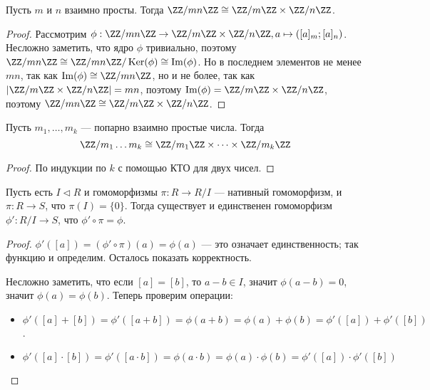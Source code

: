 \documentclass[12pt,a4paper]{article}
\DeclareMathOperator{\Img}{Im}
\DeclareMathOperator{\Ker}{Ker}
\begin{document}
    \begin{theorem}
        Пусть $m$ и $n$ взаимно просты. Тогда $\ZZ/mn\ZZ \cong \ZZ/m\ZZ \times \ZZ/n\ZZ$.
    \end{theorem}

    \begin{proof}
        Рассмотрим $\phi: \ZZ/mn\ZZ \to \ZZ/m\ZZ \times \ZZ/n\ZZ, a \mapsto ([a]_m; [a]_n)$. Несложно заметить, что ядро $\phi$ тривиально, поэтому $\ZZ/mn\ZZ \cong \ZZ/mn\ZZ/\Ker(\phi) \cong \Img(\phi)$. Но в последнем элементов не менее $mn$, так как $\Img(\phi) \cong \ZZ/mn\ZZ$, но и не более, так как $|\ZZ/m\ZZ \times \ZZ/n\ZZ| = mn$, поэтому $\Img(\phi) = \ZZ/m\ZZ \times \ZZ/n\ZZ$, поэтому $\ZZ/mn\ZZ \cong \ZZ/m\ZZ \times \ZZ/n\ZZ$. 
    \end{proof}

    \begin{theorem}[КТО]
        Пусть $m_1, \dots, m_k$ --- попарно взаимно простые числа. Тогда
        \[\ZZ/m_1\dots m_k \cong \ZZ/m_1\ZZ \times \dots \times \ZZ/m_k\ZZ\]
    \end{theorem}

    \begin{proof}
        По индукции по $k$ с помощью КТО для двух чисел.
    \end{proof}

    \begin{theorem}
        Пусть есть $I \triangleleft R$ и гомоморфизмы $\pi: R \to R/I$ --- нативный гомоморфизм, и $\pi: R \to S$, что $\pi(I) = \{0\}$. Тогда существует и единственен гомоморфизм $\phi': R/I \to S$, что $\phi' \circ \pi = \phi$.
    \end{theorem}

    \begin{proof}
        $\phi'([a]) = (\phi' \circ \pi)(a) = \phi(a)$ --- это означает единственность; так функцию и определим. Осталось показать корректность.

        Несложно заметить, что если $[a] = [b]$, то $a - b \in I$, значит $\phi(a - b) = 0$, значит $\phi(a) = \phi(b)$. Теперь проверим операции:
        \begin{itemize}
            \item $\phi'([a] + [b]) = \phi'([a + b]) = \phi(a + b) = \phi(a) + \phi(b) = \phi'([a]) + \phi'([b])$.
            \item $\phi'([a] \cdot [b]) = \phi'([a \cdot b]) = \phi(a \cdot b) = \phi(a) \cdot \phi(b) = \phi'([a]) \cdot \phi'([b])$
        \end{itemize}
    \end{proof}

    \pagebreak

\end{document}
